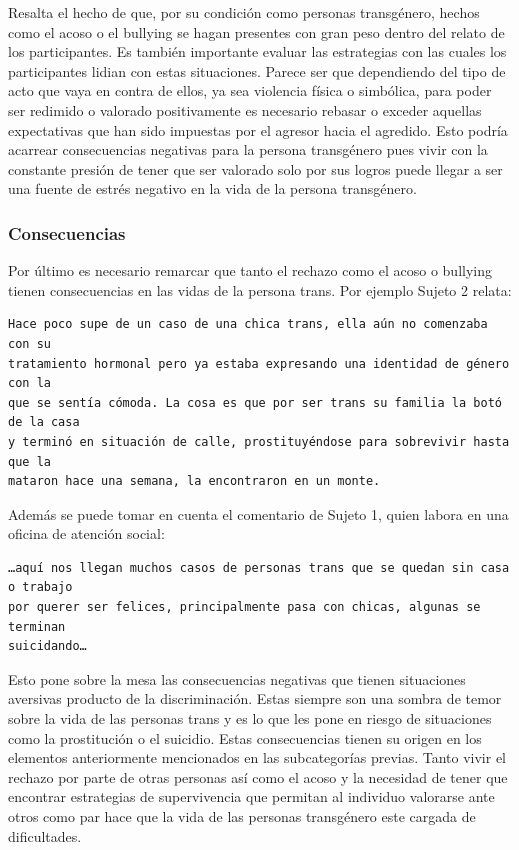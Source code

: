Resalta el hecho de que, por su condición como personas transgénero, hechos como
el acoso o el bullying se hagan presentes con gran peso dentro del relato de los
participantes. Es también importante evaluar las estrategias con las cuales los
participantes lidian con estas situaciones. Parece ser que dependiendo del tipo
de acto que vaya en contra de ellos, ya sea violencia física o simbólica, para
poder ser redimido o valorado positivamente es necesario rebasar o exceder
aquellas expectativas que han sido impuestas por el agresor hacia el agredido.
Esto podría acarrear consecuencias negativas para la persona transgénero pues
vivir con la constante presión de tener que ser valorado solo por sus logros
puede llegar a ser una fuente de estrés negativo en la vida de la persona
transgénero.

\subsubsection{Consecuencias}

Por último es necesario remarcar que tanto el rechazo como el acoso o bullying
tienen consecuencias en las vidas de la persona trans. Por ejemplo Sujeto 2
relata:

\begin{verbatim}
Hace poco supe de un caso de una chica trans, ella aún no comenzaba con su
tratamiento hormonal pero ya estaba expresando una identidad de género con la
que se sentía cómoda. La cosa es que por ser trans su familia la botó de la casa
y terminó en situación de calle, prostituyéndose para sobrevivir hasta que la
mataron hace una semana, la encontraron en un monte.
\end{verbatim}

Además se puede tomar en cuenta el comentario de Sujeto 1, quien labora en una oficina de atención social:

\begin{verbatim}
…aquí nos llegan muchos casos de personas trans que se quedan sin casa o trabajo
por querer ser felices, principalmente pasa con chicas, algunas se terminan
suicidando…
\end{verbatim}

 Esto pone sobre la mesa las consecuencias negativas que tienen situaciones
 aversivas producto de la discriminación. Estas siempre son una sombra de temor
 sobre la vida de las personas trans y es lo que les pone en riesgo de
 situaciones como la prostitución o el suicidio. Estas consecuencias tienen su
 origen en los elementos anteriormente mencionados en las subcategorías previas.
 Tanto vivir el rechazo por parte de otras personas así como el acoso y la
 necesidad de tener que encontrar estrategias de supervivencia que permitan al
 individuo valorarse ante otros como par hace que la vida de las personas
 transgénero este cargada de dificultades.

